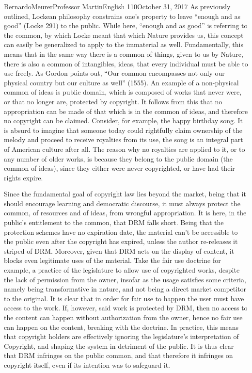 \documentclass[12pt,letterpaper]{article}
\begin{document}
\begin{mla}{Bernardo}{Meurer}{Professor Martin}{English 110}{October 31, 2017}
    As previously outlined, Lockean philosophy constrains one's property to leave ``enough and as good'' (Locke 291) to the public. While here, ``enough and as good'' is referring to the common, by which Locke meant that which Nature provides us, this concept can easily be generalized to apply to the immaterial as well. Fundamentally, this means that in the same way there is a common of things, given to us by Nature, there is also a common of intangibles, ideas, that every individual must be able to use freely. As Gordon points out, ``Our common encompasses not only our physical country but our culture as well'' (1555). An example of a non-physical common of ideas is public domain, which is composed of works that never were, or that no longer are, protected by copyright. It follows from this that no appropriation can be made of that which is in the common of ideas, and therefore no copyright can be claimed. Consider, for example, the happy birthday song. It is absurd to imagine that someone today could rightfully claim ownership of the melody and proceed to receive royalties from its use, the song is an integral part of American culture after all. The reason why no royalties are applied to it, or to any number of older works, is because they belong to the public domain (the common of ideas), since they either were never copyrighted, or have had their rights expire.
    
    Since the fundamental goal of copyright law lies beyond the market, being that it should encourage learning and democratic discourse, it must always protect the common, of resources and of ideas, from wrongful appropriation. It is here, in the public's entitlement to the common, that DRM falls short. Being that the protection schemes have no expiration date, the material can't be accessible to the public even after the copyright has expired, unless the author re-releases it striped of DRM. Moreover, given that DRM acts on the display of content, it blocks even legitimate uses of the material. Take the fair use doctrine for example, a practice of the legislature to allow use of copyrighted works, despite the lack of permission from the owner, insofar as the usage satisfies some criteria, namely being transformative in nature, and not being a direct market competitor to the original. It is clear that in order for fair use to happen the user must have access to the work. If, however, said work is protected by DRM, then no access to the content can happen without authorization from the owner, hence no fair use can happen on the content, breaking with the doctrine. In practice, this means that copyright holders are effectively ignoring the legislature's interpretation of Copyright, and shaping the system in detriment of the public. It is thus clear that DRM infringes on the public common, and that therefore it infringes on copyright itself, even if its intention was to safeguard it.


\end{mla}
\end{document}
